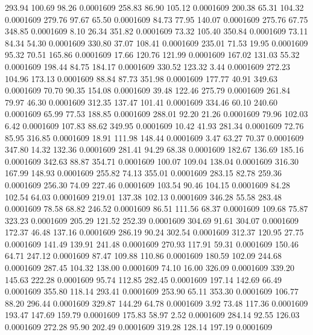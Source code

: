  293.94  100.69   98.26   0.0001609
 258.83   86.90  105.12   0.0001609
 200.38   65.31  104.32   0.0001609
 279.76   97.67   65.50   0.0001609
  84.73   77.95  140.07   0.0001609
 275.76   67.75  348.85   0.0001609
   8.10   26.34  351.82   0.0001609
  73.32  105.40  350.84   0.0001609
  73.11   84.34   54.30   0.0001609
 330.80   37.07  108.41   0.0001609
 235.01   71.53   19.95   0.0001609
  95.32   70.51  165.86   0.0001609
  17.66  120.76  121.99   0.0001609
 167.02  131.03   55.32   0.0001609
 198.44   84.75  184.17   0.0001609
 330.52  123.32    3.44   0.0001609
 272.23  104.96  173.13   0.0001609
  88.84   87.73  351.98   0.0001609
 177.77   40.91  349.63   0.0001609
  70.70   90.35  154.08   0.0001609
  39.48  122.46  275.79   0.0001609
 261.84   79.97   46.30   0.0001609
 312.35  137.47  101.41   0.0001609
 334.46   60.10  240.60   0.0001609
  65.99   77.53  188.85   0.0001609
 288.01   92.20   21.26   0.0001609
  79.96  102.03    6.42   0.0001609
 107.83   88.62  349.95   0.0001609
  10.42   41.93  281.34   0.0001609
  72.76   85.95  316.85   0.0001609
  18.91  111.98  148.44   0.0001609
   3.47   63.27   70.37   0.0001609
 347.80   14.32  132.36   0.0001609
 281.41   94.29   68.38   0.0001609
 182.67  136.69  185.16   0.0001609
 342.63   88.87  354.71   0.0001609
 100.07  109.04  138.04   0.0001609
 316.30  167.99  148.93   0.0001609
 255.82   74.13  355.01   0.0001609
 283.15   82.78  259.36   0.0001609
 256.30   74.09  227.46   0.0001609
 103.54   90.46  104.15   0.0001609
  84.28  102.54   64.03   0.0001609
 219.01  137.38  102.13   0.0001609
 346.28   55.58  283.48   0.0001609
  78.58   68.82  246.52   0.0001609
  86.51  111.56   68.37   0.0001609
 109.68   75.87  323.23   0.0001609
 205.29  121.52  252.39   0.0001609
 304.69   91.61  304.07   0.0001609
 172.37   46.48  137.16   0.0001609
 286.19   90.24  302.54   0.0001609
 312.37  120.95   27.75   0.0001609
 141.49  139.91  241.48   0.0001609
 270.93  117.91   59.31   0.0001609
 150.46   64.71  247.12   0.0001609
  87.47  109.88  110.86   0.0001609
 180.59  102.09  244.68   0.0001609
 287.45  104.32  138.00   0.0001609
  74.10   16.00  326.09   0.0001609
 339.20  145.63  222.28   0.0001609
  95.74  112.85  282.45   0.0001609
 197.14  142.69   66.49   0.0001609
 355.80  118.14  293.41   0.0001609
 253.90   65.11  353.30   0.0001609
 106.77   88.20  296.44   0.0001609
 329.87  144.29   64.78   0.0001609
   3.92   73.48  117.36   0.0001609
 193.47  147.69  159.79   0.0001609
 175.83   58.97    2.52   0.0001609
 284.14   92.55  126.03   0.0001609
 272.28   95.90  202.49   0.0001609
 319.28  128.14  197.19   0.0001609

